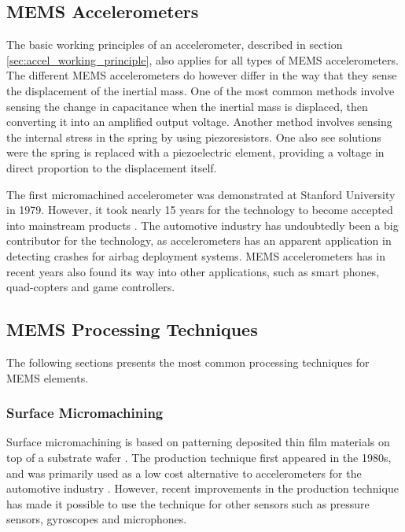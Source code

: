 \subsection{MEMS Accelerometers}

The basic working principles of an accelerometer, described in section \ref{sec:accel_working_principle}, also applies for all types of MEMS accelerometers. The different MEMS accelerometers do however differ in the way that they sense the displacement of the inertial mass. One of the most common methods involve sensing the change in capacitance when the inertial mass is displaced, then converting it into an amplified output voltage. Another method involves sensing the internal stress in the spring by using piezoresistors. One also see solutions were the spring is replaced with a piezoelectric element, providing a voltage in direct proportion to the displacement itself.

The first micromachined accelerometer was demonstrated at Stanford University in 1979. However, it took nearly 15 years for the technology to become accepted into mainstream products \cite[p.~8]{maluf04}. The automotive industry has undoubtedly been a big contributor for the technology, as accelerometers has an apparent application in detecting crashes for airbag deployment systems. MEMS accelerometers has in recent years also found its way into other applications, such as smart phones, quad-copters and game controllers. 

\subsection{MEMS Processing Techniques}

The following sections presents the most common processing techniques for MEMS elements.  

\subsubsection{Surface Micromachining}

Surface micromachining is based on patterning deposited thin film materials on top of a substrate wafer \cite[p.~5]{kaajakari09}. The production technique first appeared in the 1980s, and was primarily used as a low cost alternative to accelerometers for the automotive industry \cite[p.~101]{maluf04}. However, recent improvements in the production technique has made it possible to use the technique for other sensors such as pressure sensors, gyroscopes and microphones. 

